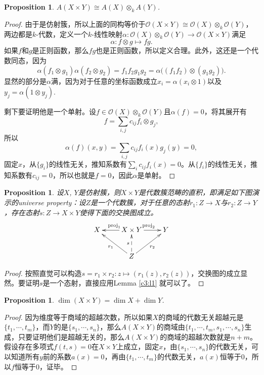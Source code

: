 \documentclass[9pt]{extbook}
\theoremstyle{plain}%
\newtheorem{pro}[defi]{Proposition}%
\begin{document}
\begin{pro}
	$A(X\times Y)\cong A(X)\otimes_k A(Y)$.
\end{pro}
\begin{proof}
由于是仿射簇，所以上面的同构等价于$\mathcal{O}(X\times Y)\cong \mathcal{O}(X)\otimes_k \mathcal{O}(Y)$，两边都是$k$-代数，定义一个$k$-线性映射$\alpha : \mathcal{O}(X)\otimes_k \mathcal{O}(Y)\to \mathcal{O}(X\times Y)$满足
\[
	\alpha:f\otimes g \mapsto fg.
\]
如果$f$和$g$是正则函数，那么$fg$也是正则函数，所以定义合理。此外，这还是一个代数同态，因为
\[
	\alpha(f_1\otimes g_1)\alpha(f_2\otimes g_2)=f_1f_2g_1g_2=\alpha\bigl((f_1f_2)\otimes (g_1g_2)\bigr).
\]
显然的部分是$\alpha$满，因为对于任意的坐标函数成立$x_i=\alpha(x_i\otimes 1)$以及$y_j=\alpha(1\otimes y_j)$.

剩下要证明他是一个单射。设$f\in \mathcal{O}(X)\otimes_k \mathcal{O}(Y)$且$\alpha(f)=0$，将其展开有
\[
	f=\sum_{i,j}c_{ij}f_i\otimes g_j,
\]
所以
\[
	\alpha(f)(x,y)=\sum_{i,j}c_{ij}f_i(x)g_j(y)=0,
\]
固定$x$，从$\{g_i\}$的线性无关，推知系数有$\sum_{i}c_{ij}f_i(x)=0$。从$\{f_i\}$的线性无关，推知系数有$c_{ij}=0$，所以也就是$f=0$，因此$\alpha$是单射。
\end{proof}
\begin{pro}
	设$X$, $Y$是仿射簇，则$X\times Y$是代数簇范畴的直积，即满足如下图演示的universe property：设$Z$是一个代数簇，对于任意的态射$r_1:Z\to X$与$r_2:Z\to Y$，存在态射$s:Z\to X\times Y$使得下面的交换图成立。
	\[
		\xymatrix{
			X&\ar[l]_{\mathrm{proj}_1}X\times Y\ar[r]^{\mathrm{proj}_2}&Y \\
			&Z\ar@{-->}[u]^s\ar[ul]^{r_1}\ar[ur]_{r_2}&
			}
	\]
\end{pro}
\begin{proof}
	按照直觉可以构造$s=r_1\times r_2:z\mapsto (r_1(z),r_2(z))$，交换图的成立显然。要证明$s$是一个态射，直接应用Lemma \ref{c3:l1} 就可以了。
\end{proof}
\begin{pro}
	$\dim (X\times Y)=\dim X+\dim Y$.
\end{pro}
\begin{proof}
	因为维度等于商域的超越次数，所以如果$X$的商域的代数无关超越元是$\{t_1,\cdots,t_m\}$，而$Y$的是$\{s_1,\cdots,s_n\}$，那么$A(X\times Y)$的商域由$\{t_1,\cdots,t_m,s_1,\cdots,s_n\}$生成，只要证明他们是超越无关的，那么$A(X\times Y)$的商域的超越次数就是$n+m$。假设存在多项式$f(t,s)=0$在$X\times Y$上成立，固定$x$，由$\{s_1,\cdots,s_n\}$的代数无关，可以知道所有$y$前的系数$a(x)=0$，再由$\{t_1,\cdots,t_m\}$的代数无关，$a(x)$恒等于$0$，所以$f$恒等于$0$，证毕。
\end{proof}
\end{document}
